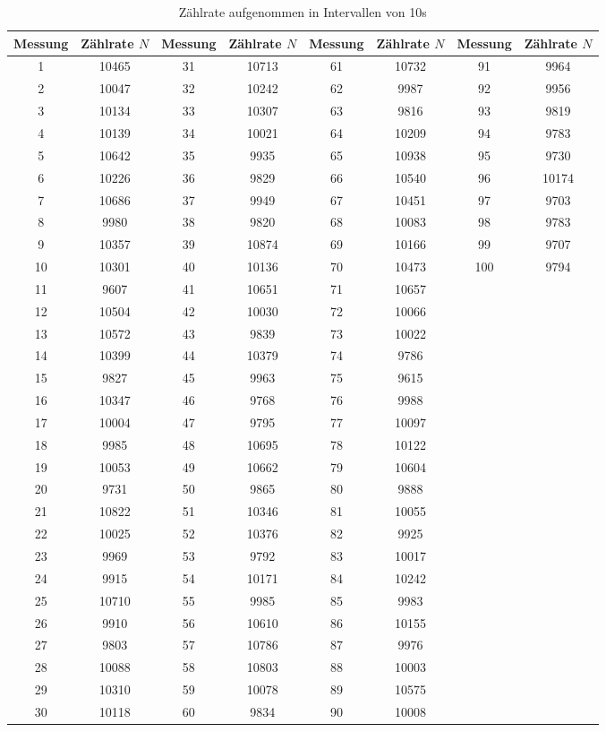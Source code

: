 \begin{table}[H]
  \centering
  \caption{Zählrate aufgenommen in Intervallen von 10\;s}
  \label{tab:tab3}
    \begin{tabular}{c c |c c| c c| c c}
    \toprule
    Messung & Zählrate $N$ & Messung & Zählrate $N$ & Messung & Zählrate $N$ & Messung & Zählrate $N$ \\
    \midrule
    1 &10465& 31 &10713 &61& 10732& 91& 9964\\
    2 &10047& 32 &10242 &62 &9987 &92 &9956\\
    3 &10134& 33 &10307 &63 &9816 &93 &9819\\
    4 &10139& 34 &10021& 64 &10209& 94& 9783\\
    5 &10642& 35 &9935 &65 &10938 &95 &9730\\
    6 &10226& 36 &9829 &66& 10540 &96 &10174\\
    7 &10686& 37 &9949 &67 &10451 &97 &9703\\
    8 &9980& 38 &9820 &68 &10083 &98 &9783\\
    9 &10357 &39 &10874 &69& 10166& 99& 9707\\
    10 &10301 &40 &10136 &70& 10473& 100& 9794\\
    11 &9607 &41 &10651 &71 &10657 & & \\
    12 &10504 &42 &10030& 72 &10066 & & \\
    13 &10572 &43 &9839 &73 &10022 & & \\
    14 &10399& 44 &10379& 74 &9786 & & \\
    15 &9827 &45 &9963 &75 &9615 & & \\
    16 &10347 &46 &9768 &76& 9988 & & \\
    17 &10004 &47 &9795& 77 &10097 & & \\
    18 &9985 &48 &10695 &78 &10122 & & \\
    19 &10053 &49 &10662 &79& 10604 & & \\
    20 &9731 &50 &9865   &80 &9888 & & \\
    21 &10822 &51 &10346 &81 &10055 & & \\
    22 &10025 &52 &10376& 82 &9925 & & \\
    23 &9969 &53 &9792   &83 &10017 & & \\
    24 &9915 &54 &10171 &84 &10242 & & \\
    25 &10710& 55 &9985 &85& 9983 & & \\
    26 &9910 &56 &10610 &86 &10155 & & \\
    27 &9803 &57& 10786& 87 &9976 & & \\
    28 &10088 &58& 10803& 88 &10003 & & \\
    29 &10310 &59 &10078& 89 &10575 & & \\
    30 &10118& 60 &9834 &90 &10008 & & \\
    \bottomrule
    \end{tabular}
  \end{table}
